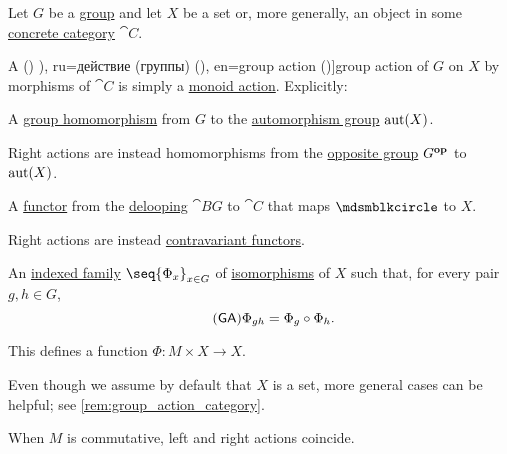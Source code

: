 \begin{definition}\label{def:group_action}\mimprovised
  Let \( G \) be a \hyperref[def:group]{group} and let \( X \) be a set or, more generally, an object in some \hyperref[def:concrete_category]{concrete category} \( \cat{C} \).

  A () \term[bg=действие (на група) (\cite[def. IV.18]{ГеновМиховскиМоллов1991Алгебра}), ru=действие (группы) (\cite[98]{Тыртышников2017ОсновыАлгебры}), en=group action (\cite[108]{Aluffi2009Algebra})]{group action} of \( G \) on \( X \) by morphisms of \( \cat{C} \) is simply a \hyperref[def:monoid_action]{monoid action}. Explicitly:
  \begin{thmenum}
     A \hyperref[def:group/homomorphism]{group homomorphism} from \( G \) to the \hyperref[def:automorphism_group]{automorphism group} \( \operatorname{aut}(X) \).

    Right actions are instead homomorphisms from the \hyperref[def:group/opposite]{opposite group} \( G^\oppos \) to \( \operatorname{aut}(X) \).

     A \hyperref[def:functor]{functor} from the \hyperref[def:monoid_delooping]{delooping} \( \cat{B} G \) to \( \cat{C} \) that maps \( \Anon \) to \( X \).

    Right actions are instead \hyperref[rem:contravariant_functor]{contravariant functors}.

     An \hyperref[def:indexed_family]{indexed family} \( \seq{ \Phi_x }_{x \in G} \) of \hyperref[def:morphism_invertibility/isomorphism]{isomorphisms} of \( X \) such that, for every pair \( g, h \in G \),
    \begin{equation}\label{eq:def:group_action/family/compatibility}\tag{\logic{GA}}
      \Phi_{gh} = \Phi_g \bincirc \Phi_h.
    \end{equation}

    This defines a function \( \Phi: M \times X \to X \).
  \end{thmenum}
\end{definition}
\begin{comments}
  \item Even though we assume by default that \( X \) is a set, more general cases can be helpful; see \cref{rem:group_action_category}.
  \item When \( M \) is commutative, left and right actions coincide.
\end{comments}

